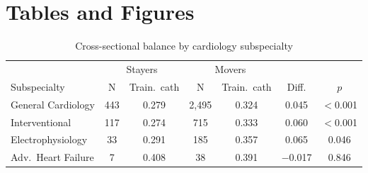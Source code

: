 \documentclass[12pt]{article}
\begin{document}
\clearpage

\begin{singlespace}


\end{singlespace}

\clearpage
\section*{Tables and Figures}

\begin{table}[htbp]
\centering
\begin{minipage}[h]{\textwidth}
  \caption{Cross-sectional balance by cardiology subspecialty}
  \label{tab:app-balance-spec}
  \centering
  \begin{tabular}{lcccccc}
  \toprule
   & \multicolumn{2}{c}{Stayers} & \multicolumn{2}{c}{Movers} & & \\
  \cmidrule(lr){2-3} \cmidrule(lr){4-5}
  Subspecialty & N & Train.\ cath & N & Train.\ cath & Diff. & $p$ \\
  \midrule
  General Cardiology     & 443   & 0.279 & 2,495 & 0.324 & 0.045 & $<$0.001 \\
  Interventional         & 117   & 0.274 & 715     & 0.333 & 0.060 & $<$0.001 \\
  Electrophysiology      & 33    & 0.291 & 185     & 0.357 & 0.065 & 0.046 \\
  Adv.\ Heart Failure    & 7     & 0.408 & 38      & 0.391 & $-$0.017 & 0.846 \\
  \bottomrule
  \end{tabular}
\end{minipage}
\end{table}

\clearpage
\begin{table}[htbp]
\centering
\begin{minipage}[h]{\textwidth}
  \caption[]{Training imprint under alternative cohort controls\footnote{The outcome is the volume-weighted mean residualized cath rate at the cardiologist-year level, on the within-origin sample. Column (1) is the within-origin baseline. Columns (2) and (3) add a linear and a quadratic graduation-year trend. Column (4) controls for the national cath lab share in the matriculation year. All specifications include medical school HRR, practice HRR, and year fixed effects, weight by NSTEMI volume, and cluster standard errors at the medical school HRR level. *** $p<0.01$, ** $p<0.05$, * $p<0.10$.}}
  \label{tab:app-cohort}
  \centering
  
\end{minipage}
\end{table}
\end{document}

